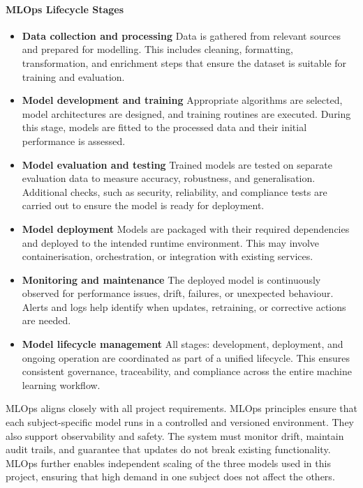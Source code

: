 \paragraph{MLOps Lifecycle Stages} \parencite{Untitled64:online}
\begin{itemize}
    \item \textbf{Data collection and processing} Data is gathered from relevant sources and prepared for modelling. This includes cleaning, formatting, transformation, and enrichment steps that ensure the dataset is suitable for training and evaluation.
    \item \textbf{Model development and training} Appropriate algorithms are selected, model architectures are designed, and training routines are executed. During this stage, models are fitted to the processed data and their initial performance is assessed.
    \item \textbf{Model evaluation and testing} Trained models are tested on separate evaluation data to measure accuracy, robustness, and generalisation. Additional checks, such as security, reliability, and compliance tests are carried out to ensure the model is ready for deployment.
    \item \textbf{Model deployment} Models are packaged with their required dependencies and deployed to the intended runtime environment. This may involve containerisation, orchestration, or integration with existing services.
    \item \textbf{Monitoring and maintenance} The deployed model is continuously observed for performance issues, drift, failures, or unexpected behaviour. Alerts and logs help identify when updates, retraining, or corrective actions are needed.
    \item \textbf{Model lifecycle management} All stages: development, deployment, and ongoing operation are coordinated as part of a unified lifecycle. This ensures consistent governance, traceability, and compliance across the entire machine learning workflow.
    
\end{itemize}

MLOps aligns closely with all project requirements. MLOps principles ensure that each subject-specific model runs in a controlled and versioned environment. They also support observability and safety. The system must monitor drift, maintain audit trails, and guarantee that updates do not break existing functionality. MLOps further enables independent scaling of the three models used in this project, ensuring that high demand in one subject does not affect the others.


